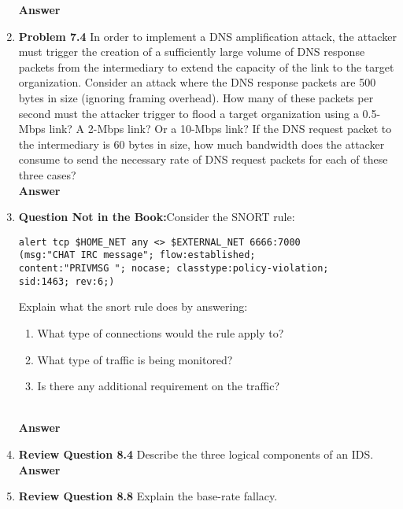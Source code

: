 \documentclass[12pt]{article}
\begin{document}
\begin{enumerate}
\textbf{Answer} \\

\item \textbf{Problem 7.4} In order to implement a DNS amplification attack, the attacker must trigger the creation of a sufficiently large volume of DNS response packets from the intermediary to extend the capacity of the link to the target organization. Consider an attack where the DNS response packets are 500 bytes in size (ignoring framing overhead). How many of these packets per second must the attacker trigger to flood a target organization using a 0.5-Mbps link? A 2-Mbps link? Or a 10-Mbps link? If the DNS request packet to the intermediary is 60 bytes in size, how much bandwidth does the attacker consume to send the necessary rate of DNS request packets for each of these three cases? \\

\textbf{Answer} \\

\item \textbf{Question Not in the Book:}Consider the SNORT rule:
\vspace{-1em}

{\color{blue}
\begin{verbatim}
alert tcp $HOME_NET any <> $EXTERNAL_NET 6666:7000
(msg:"CHAT IRC message"; flow:established;
content:"PRIVMSG "; nocase; classtype:policy-violation;
sid:1463; rev:6;)
\end{verbatim}
}
 Explain what the  snort rule does by answering:
 \begin{enumerate}
   \item What type of connections would the rule apply to?
   \item What type of traffic is being monitored?
   \item Is there any additional requirement on the traffic?
 \end{enumerate} \\

\textbf{Answer} \\

\item \textbf{Review Question 8.4} Describe the three logical components of an IDS.\\

\textbf{Answer} \\

\item \textbf{Review Question 8.8} Explain the base-rate fallacy.\\


\end{enumerate}
\end{document}
